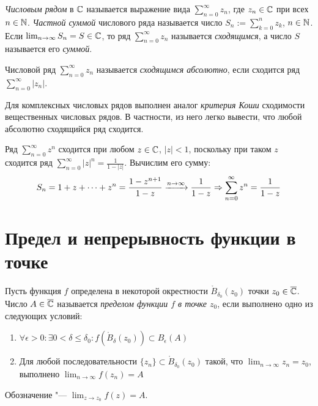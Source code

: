\begin{definition}
	\textit{Числовым рядом} в $\mathbb{C}$ называется выражение вида $\sum_{n = 0}^\infty z_n$, где $z_n \in \mathbb{C}$ при всех $n \in \mathbb{N}$. \textit{Частной суммой} числового ряда называется число $S_n := \sum_{k = 0}^nz_k$, $n \in \mathbb{N}$. Если $\lim_{n \to \infty}S_n = S \in \mathbb{C}$, то ряд $\sum_{n = 0}^\infty z_n$ называется \textit{сходящимся}, а число $S$ называется его \textit{суммой}.
\end{definition}

\begin{definition}
	Числовой ряд $\sum_{n = 0}^\infty z_n$ называется \textit{сходящимся абсолютно}, если сходится ряд $\sum_{n = 0}^\infty|z_n|$.
\end{definition}

\begin{note}
	Для комплексных числовых рядов выполнен аналог \textit{критерия Коши} сходимости вещественных числовых рядов. В частности, из него легко вывести, что любой абсолютно сходящийся ряд сходится.
\end{note}

\begin{example}
	Ряд $\sum_{n=0}^\infty z^n$ сходится при любом $z \in \mathbb{C}$, $|z| < 1$, поскольку при таком $z$ сходится ряд $\sum_{n=0}^\infty |z|^n = \frac1{1-|z|}$. Вычислим его сумму:
	\[S_n = 1 + z + \dotsb + z^n = \frac{1-z^{n+1}}{1-z} \xrightarrow{n \to \infty} \frac1{1-z} \Rightarrow \sum_{n=0}^\infty z^n = \frac1{1-z}\]
\end{example}

\section{Предел и непрерывность функции в точке}

\begin{definition}
	Пусть функция $f$ определена в некоторой окрестности $\mathring B_{\delta_0}(z_0)$ точки $z_0 \in \overline{\mathbb{C}}$. Число $A \in \overline{\mathbb{C}}$ называется \textit{пределом функции $f$ в точке $z_0$}, если выполнено одно из следующих условий:
	\begin{enumerate}
		\item $\forall \epsilon > 0: \exists 0 < \delta \le \delta_0: f(\mathring B_\delta(z_0)) \subset B_\epsilon(A)$
		\item Для любой последовательности $\{z_n\} \subset \mathring B_{\delta_0}(z_0)$ такой, что $\lim_{n \to \infty}z_n = z_0$, выполнено $\lim_{n \to \infty}f(z_n) = A$
	\end{enumerate}
	
	Обозначение "--- $\lim_{z \to z_0}f(z) = A$.
\end{definition}

